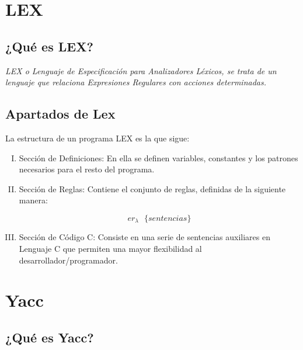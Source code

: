 \documentclass{beamer}
\theoremstyle{definition}
\theoremstyle{remark}
\begin{document}
\section{LEX}

\subsection{¿Qué es LEX?}

\begin{frame}
\textit{LEX o Lenguaje de Especificación para Analizadores Léxicos, se trata de un lenguaje que relaciona Expresiones Regulares con acciones determinadas.}
\end{frame}

\subsection{Apartados de Lex}

\begin{frame}
La estructura de un programa LEX es la que sigue:

\begin{enumerate}[I.]

\item Sección de Definiciones: En ella se definen variables, constantes y los patrones necesarios para el resto del programa.

\item Sección de Reglas: Contiene el conjunto de reglas, definidas de la siguiente manera:

\begin{equation}
er_\lambda\ \ \ \{sentencias\}
\end{equation}

\item Sección de Código C: Consiste en una serie de sentencias auxiliares en Lenguaje C que permiten una mayor flexibilidad al desarrollador/programador.

\end{enumerate}
\end{frame}

\section{Yacc}

\subsection{¿Qué es Yacc?}
\end{document}

